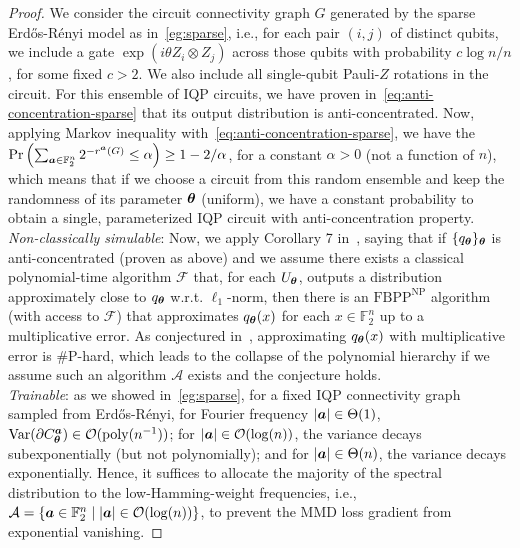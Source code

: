 \documentclass[10pt, twocolumn, a4paper]{article}
\theoremstyle{plain}
\theoremstyle{definition}
\theoremstyle{remark}
\begin{document}
\begin{proof}
    We consider the circuit connectivity graph $G$ generated by the sparse Erd\H os-R\'enyi model as in~\cref{eg:sparse}, i.e., for each pair $(i, j)$ of distinct qubits, we include a gate $\exp({i\theta Z_i\otimes Z_j})$ across those qubits with probability $c\log n/n$, for some fixed $c>2$. We also include all single-qubit Pauli-$Z$ rotations in the circuit. For this ensemble of IQP circuits, we have proven in~\cref{eq:anti-concentration-sparse} that its output distribution is anti-concentrated. Now, applying Markov inequality with~\cref{eq:anti-concentration-sparse}, we have the $\Pr\left(\sum_{{\bm{a}} \in \mathbb{F}_2^n}  2^{-r^{\bm{a}}(G)} \le \alpha\right) \ge 1 - 2/\alpha$, for a constant $\alpha >0$ (not a function of $n$), which means that if we choose a circuit from this random ensemble and keep the randomness of its parameter ${\bm{\theta}}$ (uniform), we have a constant probability to obtain a single, parameterized IQP circuit with anti-concentration property.  \\
    \emph{Non-classically simulable}: Now, we apply Corollary 7 in~\cite{Bremner17}, saying that if $\{q_{\bm{\theta}}\}_{\bm{\theta}}$ is anti-concentrated (proven as above) and we assume there exists a classical polynomial-time algorithm $\mathcal{F}$ that, for each $U_{\bm{\theta}}$, outputs a distribution approximately close to $q_{\bm{\theta}}$ w.r.t. $\ell_1$-norm, then there is an $\text{FBPP}^{\text{NP}}$ algorithm (with access to $\mathcal{F}$) that approximates $q_{\bm{\theta}}(x)$ for each $x\in\mathbb{F}_2^n$ up to a multiplicative error. As conjectured in~\cite{Bremner17}, approximating $q_{\bm{\theta}}(x)$ with multiplicative error is \#P-hard, which leads to the collapse of the polynomial hierarchy if we assume such an algorithm $\mathcal{A}$ exists and the conjecture holds.\\
    \emph{Trainable}: as we showed in~\cref{eg:sparse}, for a fixed IQP connectivity graph sampled from Erd\H{o}s-R\'enyi, for Fourier frequency $|{\bm{a}}|\in \Theta(1)$, $\operatorname{Var}(\partial C_{\bm{\theta}}^{\bm{a}}) \in \mathcal{O}(\mathrm{poly}(n^{-1}))$; for $|{\bm{a}}|\in \mathcal{O}(\log(n))$, the variance decays subexponentially (but not polynomially); and for $|{\bm{a}}|\in \Theta(n)$, the variance decays exponentially. Hence, it suffices to allocate the majority of the spectral distribution to the low-Hamming-weight frequencies, i.e., $\mathcal{A}=\{{\bm{a}}\in\mathbb{F}_2^n \;\vert\; |{\bm{a}}|\in \mathcal{O}(\log(n))\}$, to prevent the MMD loss gradient from exponential vanishing.
\end{proof}
\end{document}
